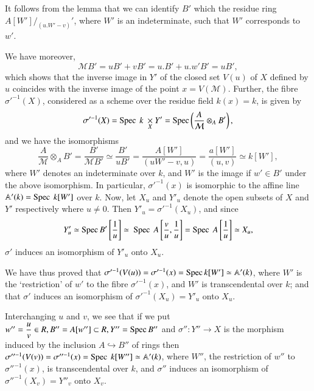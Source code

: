 It follows from the lemma that we can identify $B'$ which the residue
ring $A[W']/_{(u.W'-v)}'$, where $W'$ is an indeterminate, such that
$W'$ corresponds to $w'$. 

We have moreover,
$$
\mathcal{M}B' = uB' + v B' = u.B' + u. w' B' = u B',
$$
which shows that the inverse image in $Y'$ of the closed set $V(u)$ of
$X$ defined by $u$ coincides with the inverse image of the point $x =
V(\mathcal{M})$. Further, the fibre $\sigma '^{-1} (X)$, considered as
a scheme over the residue field $k(x) = k$, is given by 
$$
\sigma '^{-1} (X) = \operatorname{Spec} ~ k ~ \underset{X}\times Y' = \operatorname{Spec}
\left(\frac{A}{\mathcal{M}}\otimes_A B'\right), 
$$
and we have the isomorphisms
$$
\frac{A}{\mathcal{M}}\otimes_A B' = \frac{B'} {\mathcal{M}B'} \simeq
\frac{B'}{u B'} = \frac{A[W']} {(u W' - v, u)} = \frac{a[W']}{(u,v)}
\simeq k[W'], 
$$\pageoriginale
where $W'$ denotes an indeterminate over $k$, and $W'$ is the image if
$w' \in B'$ under the above isomorphism. In particular, $\sigma '^{-1}
(x)$ is isomorphic to the affine line $\mathbb{A'} (k) = \operatorname{Spec} ~
k[W']$ over $k$. Now, let $X_u$ and $Y'_u$ denote the open subsets of
$X$ and $Y'$ respectively where $u \neq 0$. Then $Y'_u = \sigma '^{-1}
(X_u)$, and since  
$$
Y'_u \simeq \operatorname{Spec} B' \left[ \frac {1}{u} \right] \simeq ~ \operatorname{Spec} ~ A \left[
  \frac{v}{u} , \frac{1}{u}\right] = \operatorname{Spec} ~ A \left[ \frac{1}{u} \right]
\simeq X_u, 
$$
$\sigma'$ induces an isomorphism of $Y'_u$ onto $X_u$.

We have thus proved that $\sigma'^{-1}(V(u)) = \sigma'^{-1} (x) =
\operatorname{Spec} k [W']\simeq \mathbb{A}' (k)$, where $W'$ is the `restriction'
of $w'$ to the fibre $\sigma'^{-1}(x)$, and $W'$ is transcendental over
$k$; and that $\sigma'$ induces an isomorphism of $\sigma'^{-1}(X_u)
= Y'_u$ onto $X_u$.  

Interchanging $u$ and $v$, we see that if we put $w'' = \dfrac {u}{v}
\in R, B'' = A[w''] \subset R, Y'' = \operatorname{Spec} B''$ and $\sigma'' : 
Y'' \rightarrow X$ is the morphism induced by the inclusion $A
\hookrightarrow B''$ of rings then $\sigma''^{-1} (V(v)) =
\sigma''^{-1}(x) = \operatorname{Spec} ~ k[W''] \simeq \mathbb{A'}(k)$, where $W''$,
the restriction of $w''$ to $\sigma''^{-1}(x)$, is transcendental over
$k$, and $\sigma''$ induces an isomorphism of $\sigma''^{-1} (X_v) =
Y''_v$ onto $X_v$. 


